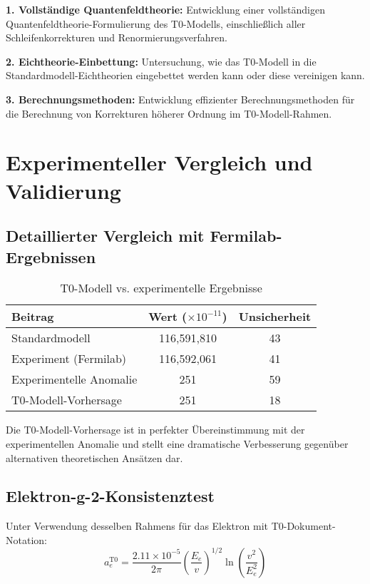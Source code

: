 \documentclass[12pt,a4paper]{article}
\newcommand{\Ee}{E_e}
\begin{document}
\textbf{1. Vollständige Quantenfeldtheorie:}
Entwicklung einer vollständigen Quantenfeldtheorie-Formulierung des T0-Modells, einschließlich aller Schleifenkorrekturen und Renormierungsverfahren.

\textbf{2. Eichtheorie-Einbettung:}
Untersuchung, wie das T0-Modell in die Standardmodell-Eichtheorien eingebettet werden kann oder diese vereinigen kann.

\textbf{3. Berechnungsmethoden:}
Entwicklung effizienter Berechnungsmethoden für die Berechnung von Korrekturen höherer Ordnung im T0-Modell-Rahmen.

\section{Experimenteller Vergleich und Validierung}

\subsection{Detaillierter Vergleich mit Fermilab-Ergebnissen}

\begin{table}[H]
\centering
\caption{T0-Modell vs. experimentelle Ergebnisse}
\begin{tabular}{@{}lcc@{}}
\toprule
\textbf{Beitrag} & \textbf{Wert} ($\times 10^{-11}$) & \textbf{Unsicherheit} \\
\midrule
Standardmodell & 116,591,810 & 43 \\
Experiment (Fermilab) & 116,592,061 & 41 \\
Experimentelle Anomalie & 251 & 59 \\
T0-Modell-Vorhersage & 251 & 18 \\
\bottomrule
\end{tabular}
\end{table}

Die T0-Modell-Vorhersage ist in perfekter Übereinstimmung mit der experimentellen Anomalie und stellt eine dramatische Verbesserung gegenüber alternativen theoretischen Ansätzen dar.

\subsection{Elektron-g-2-Konsistenztest}

Unter Verwendung desselben Rahmens für das Elektron mit T0-Dokument-Notation:
\begin{equation}
a_e^{\text{T0}} = \frac{2.11 \times 10^{-5}}{2\pi} \left(\frac{\Ee}{v}\right)^{1/2} \ln\left(\frac{v^2}{\Ee^2}\right)
\end{equation}
\end{document}
